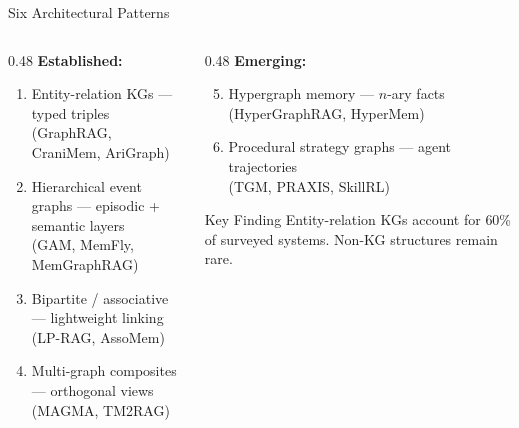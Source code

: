 \documentclass[aspectratio=169]{beamer}
\begin{document}
\begin{frame}{Six Architectural Patterns}
  \begin{columns}[T]
    \begin{column}{0.48\textwidth}
      \textbf{Established:}
      \begin{enumerate}
        \item \alert{Entity-relation KGs} --- typed triples\\
          {\small (GraphRAG, CraniMem, AriGraph)}
        \item \alert{Hierarchical event graphs} --- episodic + semantic layers\\
          {\small (GAM, MemFly, MemGraphRAG)}
        \item \alert{Bipartite / associative} --- lightweight linking\\
          {\small (LP-RAG, AssoMem)}
        \item \alert{Multi-graph composites} --- orthogonal views\\
          {\small (MAGMA, TM2RAG)}
      \end{enumerate}
    \end{column}

    \begin{column}{0.48\textwidth}
      \textbf{Emerging:}
      \begin{enumerate}
        \setcounter{enumi}{4}
        \item \alert{Hypergraph memory} --- $n$-ary facts\\
          {\small (HyperGraphRAG, HyperMem)}
        \item \alert{Procedural strategy graphs} --- agent trajectories\\
          {\small (TGM, PRAXIS, SkillRL)}
      \end{enumerate}

      \vspace{0.4cm}

      \begin{block}{Key Finding}
        Entity-relation KGs account for \alert{60\%} of surveyed systems.
        Non-KG structures remain rare.
      \end{block}
    \end{column}
  \end{columns}
\end{frame}
\end{document}
